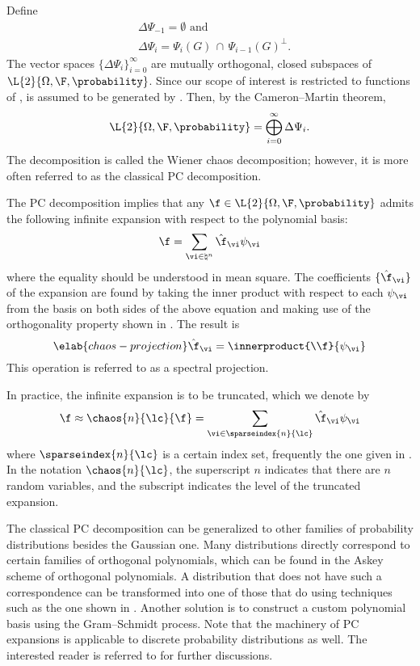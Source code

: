 Define
\begin{align*}
  & \Delta\Psi_{-1} = \emptyset \text{ and} \\
  & \Delta\Psi_i = \Psi_i(G) \, \cap \, \Psi_{i - 1}(G)^\perp.
\end{align*}
The vector spaces $\{ \Delta\Psi_i \}_{i = 0}^\infty$ are mutually orthogonal,
closed subspaces of $\L{2}{\Omega, \F, \probability}$. Since our scope of
interest is restricted to functions of \vx, \F is assumed to be generated by
\vx. Then, by the Cameron--Martin theorem,
\[
  \L{2}{\Omega, \F, \probability} = \bigoplus_{i = 0}^\infty \Delta\Psi_i.
\]
The decomposition is called the Wiener chaos decomposition; however, it is more
often referred to as the classical \ac{PC} decomposition.

The \ac{PC} decomposition implies that any $\f \in \L{2}{\Omega, \F,
\probability}$ admits the following infinite expansion with respect to the
polynomial basis:
\[
  \f = \sum_{\vi \in \natural^n} \hat{\f}_{\vi} \psi_{\vi}
\]
where the equality should be understood in mean square. The coefficients $\{
\hat{\f}_{\vi} \}$ of the expansion are found by taking the inner product with
respect to each $\psi_{\vi}$ from the basis on both sides of the above equation
and making use of the orthogonality property shown in
. The result is
\begin{equation} \elab{chaos-projection}
  \hat{\f}_{\vi} = \innerproduct{\\f}{\psi_{\vi}}
\end{equation}
This operation is referred to as a spectral projection.

In practice, the infinite expansion is to be truncated, which we denote by
\[
  \f \approx \chaos{n}{\lc}{\f} = \sum_{\vi \in \sparseindex{n}{\lc}} \hat{\f}_{\vi} \psi_{\vi}
\]
where $\sparseindex{n}{\lc}$ is a certain index set, frequently the one given in
. In the notation $\chaos{n}{\lc}$, the
superscript $n$ indicates that there are $n$ random variables, and the subscript
\lc indicates the level of the truncated expansion.

The classical \ac{PC} decomposition can be generalized to other families of
probability distributions besides the Gaussian one. Many distributions directly
correspond to certain families of orthogonal polynomials, which can be found in
the Askey scheme of orthogonal polynomials. A distribution that does not have
such a correspondence can be transformed into one of those that do using
techniques such as the one shown in . Another
solution is to construct a custom polynomial basis using the Gram--Schmidt
process. Note that the machinery of \ac{PC} expansions is applicable to discrete
probability distributions as well. The interested reader is referred to
\cite{xiu2010} for further discussions.

